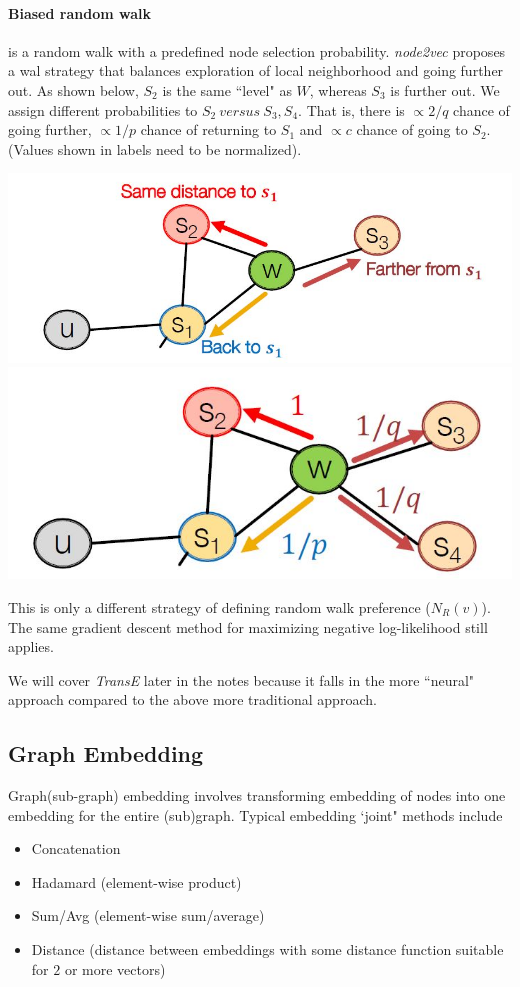\paragraph{Biased random walk} is a random walk with a predefined node selection probability. \textit{node2vec} proposes a wal strategy that balances exploration of local neighborhood and going further out. As shown below, $S_2$ is the same ``level" as $W$, whereas $S_3$ is further out. We assign different probabilities to $S_2\ versus\ S_3, S_4$. That is, there is $\propto 2/q$ chance of going further, $\propto 1/p$ chance of returning to $S_1$ and $\propto c$ chance of going to $S_2$. (Values shown in labels need to be normalized).

{
\centering
\includegraphics[width=0.45\linewidth]{notes/img/l7_p41_bias1.JPG}
\hspace{1cm}
\includegraphics[width=0.45\linewidth]{notes/img/l7_p41_bias2.JPG} \par
}

This is only a different strategy of defining random walk preference ($N_R(v)$). The same gradient descent method for maximizing negative log-likelihood still applies.

We will cover \textit{TransE} later in the notes because it falls in the more ``neural" approach compared to the above more traditional approach.

\subsection{Graph Embedding}

Graph(sub-graph) embedding involves transforming embedding of nodes into one embedding for the entire (sub)graph. Typical embedding `joint" methods include 

\begin{itemize}
    \item Concatenation
    
    \item Hadamard (element-wise product)
    
    \item Sum/Avg (element-wise sum/average)
    
    \item Distance (distance between embeddings with some distance function suitable for $2$ or more vectors)
\end{itemize}{}

